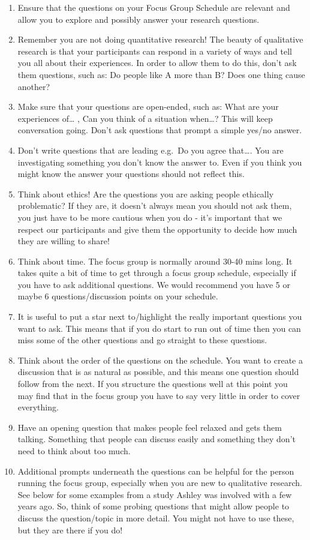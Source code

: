 \documentclass[
  english,
  letterpaper,
  DIV=11,
  numbers=noendperiod]{scrreprt}
\begin{document}
\begin{enumerate}
\def\labelenumi{\arabic{enumi}.}
\item
  Ensure that the questions on your Focus Group Schedule are relevant
  and allow you to explore and possibly answer your research questions.
\item
  Remember you are not doing quantitative research! The beauty of
  qualitative research is that your participants can respond in a
  variety of ways and tell you all about their experiences. In order to
  allow them to do this, don't ask them questions, such as: Do people
  like A more than B? Does one thing cause another?
\item
  Make sure that your questions are open-ended, such as: What are your
  experiences of\ldots{} , Can you think of a situation when\ldots? This
  will keep conversation going. Don't ask questions that prompt a simple
  yes/no answer.
\item
  Don't write questions that are leading e.g.~Do you agree that\ldots.
  You are investigating something you don't know the answer to. Even if
  you think you might know the answer your questions should not reflect
  this.
\item
  Think about ethics! Are the questions you are asking people ethically
  problematic? If they are, it doesn't always mean you should not ask
  them, you just have to be more cautious when you do - it's important
  that we respect our participants and give them the opportunity to
  decide how much they are willing to share!
\item
  Think about time. The focus group is normally around 30-40 mins long.
  It takes quite a bit of time to get through a focus group schedule,
  especially if you have to ask additional questions. We would recommend
  you have 5 or maybe 6 questions/discussion points on your schedule.
\item
  It is useful to put a star next to/highlight the really important
  questions you want to ask. This means that if you do start to run out
  of time then you can miss some of the other questions and go straight
  to these questions.
\item
  Think about the order of the questions on the schedule. You want to
  create a discussion that is as natural as possible, and this means one
  question should follow from the next. If you structure the questions
  well at this point you may find that in the focus group you have to
  say very little in order to cover everything.
\item
  Have an opening question that makes people feel relaxed and gets them
  talking. Something that people can discuss easily and something they
  don't need to think about too much.
\item
  Additional prompts underneath the questions can be helpful for the
  person running the focus group, especially when you are new to
  qualitative research. See below for some examples from a study Ashley
  was involved with a few years ago. So, think of some probing questions
  that might allow people to discuss the question/topic in more detail.
  You might not have to use these, but they are there if you do!
\end{enumerate}
\end{document}
